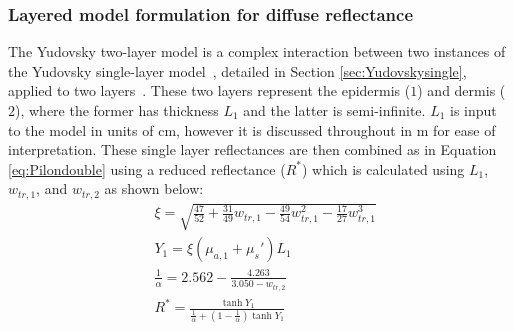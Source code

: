 \subsubsection{Layered model formulation for diffuse reflectance}\label{sec:Yudovsky2009}
% 
The Yudovsky two-layer model is a complex interaction between two instances of the Yudovsky single-layer model~\citep{Yudovsky2009}, detailed in Section \ref{sec:Yudovskysingle}, applied to two layers~\citep{Yudovsky2009}. 
These two layers represent the epidermis ($1$) and dermis ($2$), where the former has thickness $L_1$ and the latter is semi-infinite. $L_1$ is input to the model in units of cm, however it is discussed throughout in \textmu m for ease of interpretation.
These single layer reflectances are then combined as in Equation \eqref{eq:Pilondouble} using a reduced reflectance ($R^*$) which is calculated using $L_1$, $w_{tr, 1}$, and $w_{tr,2}$ as 
shown below:
\begin{equation}
\begin{aligned}
    & \xi = \sqrt{\frac{47}{52} + \frac{31}{49}w_{tr, 1} - \frac{49}{54}w_{tr, 1}^2 - \frac{17}{27}w_{tr, 1}^3} \\
    & Y_1 = \xi(\mu_{a,1} + \mu_s')L_1 \\
    & \frac{1}{\alpha} = 2.562 - \frac{4.263}{3.050 - w_{tr, 2}} \\
    & R^* = \frac{\tanh{Y_1}}{\frac{1}{\alpha} + (1 - \frac{1}{\alpha})\tanh{Y_1}} \\
\end{aligned}
\label{eq:reducedR}
\end{equation} 
